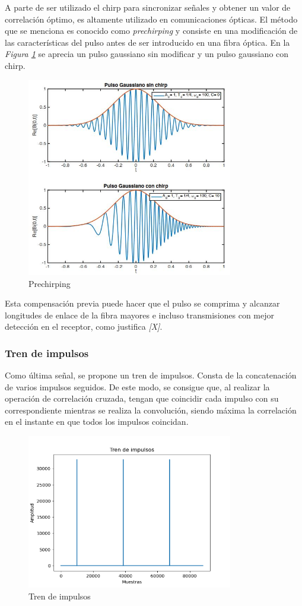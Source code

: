 \documentclass[a4paper,11pt]{book}
\begin{document}
A parte de ser utilizado el chirp para sincronizar señales y obtener un valor de correlación óptimo, es altamente utilizado en comunicaciones ópticas. El método que se menciona es conocido como \textit{prechirping} y consiste en una modificación de las características del pulso antes de ser introducido en una fibra óptica. En la \textit{Figura \ref{prechirping}} se aprecia un pulso gaussiano sin modificar y un pulso gaussiano con chirp.

\begin{figure}[hbtp]
\centering
\includegraphics[width = 9cm]{FIGURAS/chirp.JPG}
\caption{Prechirping}
\label{prechirping}
\end{figure}


Esta compensación previa puede hacer que el pulso se comprima y alcanzar longitudes de enlace de la fibra mayores e incluso  transmisiones con mejor detección en el receptor, como justifica \textit{[X]}.

\subsubsection{Tren de impulsos}
Como última señal, se propone un tren de impulsos. Consta de la concatenación de varios impulsos seguidos. De este modo, se consigue que, al realizar la operación de correlación cruzada, tengan que coincidir cada impulso con su correspondiente mientras se realiza la convolución, siendo máxima la correlación en el instante en que todos los impulsos coincidan.

\begin{figure}[hbtp]
\centering
\includegraphics[width = 9cm]{FIGURAS/tren_impulsos.png}
\caption{Tren de impulsos}
\label{tren}
\end{figure}
\end{document}
